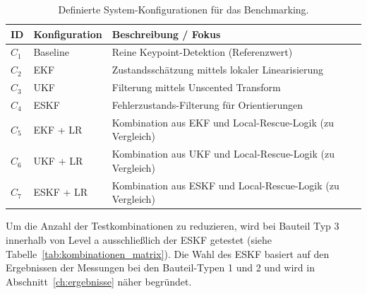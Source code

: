 \begin{table}[h]
    \centering
    \caption{Definierte System-Konfigurationen für das Benchmarking.}
    \label{tab:versuchsmatrix}
    \begin{tabular}{@{}lll@{}}
        \toprule
        \textbf{ID} & \textbf{Konfiguration} & \textbf{Beschreibung / Fokus} \\ \midrule
        $C_1$ & Baseline & Reine Keypoint-Detektion (Referenzwert) \\
        $C_2$ & \ac{EKF} & Zustandsschätzung mittels lokaler Linearisierung \\
        $C_3$ & \ac{UKF} & Filterung mittels Unscented Transform \\
        $C_4$ & \ac{ESKF} & Fehlerzustands-Filterung für Orientierungen \\
        $C_5$ & \ac{EKF} + \ac{LR} & Kombination aus \ac{EKF} und Local-Rescue-Logik (zu Vergleich) \\
        $C_6$ & \ac{UKF} + \ac{LR} & Kombination aus \ac{UKF} und Local-Rescue-Logik (zu Vergleich) \\
        $C_7$ & \ac{ESKF} + \ac{LR} & Kombination aus \ac{ESKF} und Local-Rescue-Logik (zu Vergleich) \\ \bottomrule
    \end{tabular}
\end{table}

Um die Anzahl der Testkombinationen zu reduzieren, wird bei Bauteil Typ 3 innerhalb von Level a ausschließlich der \ac{ESKF} getestet (siehe Tabelle~\ref{tab:kombinationen_matrix}). Die Wahl des \ac{ESKF} basiert auf den Ergebnissen der Messungen bei den Bauteil-Typen 1 und 2 und wird in Abschnitt~\ref{ch:ergebnisse} näher begründet.

